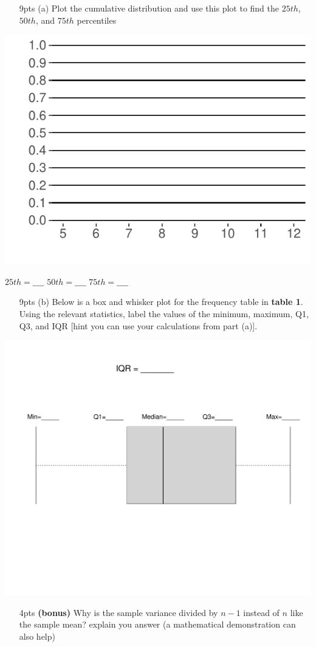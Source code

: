 \documentclass[
]{article}
\begin{document}
\begin{enumerate}
\item[9pts (a)]{Plot the cumulative distribution and use this plot to find the $25th$, $50th$, and $75th$ percentiles}
\end{enumerate}

\includegraphics{Exam_1_Version_A_files/figure-latex/unnamed-chunk-6-1.pdf}

\(25th = \_\_\_\_\) \(50th = \_\_\_\_\) \(75th = \_\_\_\_\)

\newpage
\begin{enumerate}
\item[9pts (b)] Below is a box and whisker plot for the frequency table in \textbf{table 1}. Using the relevant statistics, label the values of the minimum, maximum, Q1, Q3, and IQR [hint you can use your calculations from part (a)]. 
\end{enumerate}

\includegraphics{Exam_1_Version_A_files/figure-latex/unnamed-chunk-7-1.pdf}

\begin{enumerate}
\item[ 4pts \bf(bonus)]{Why is the sample variance divided by $n-1$ instead of $n$ like the sample mean? explain you answer (a mathematical demonstration can also help)}
\end{enumerate}
\end{document}
